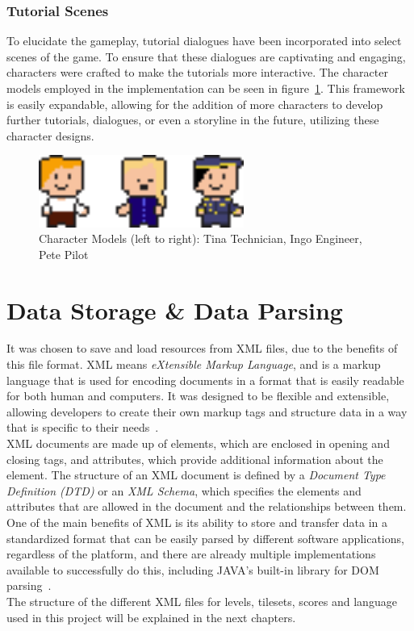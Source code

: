 \subsubsection{Tutorial Scenes}\label{subsubsec:tutorial-scenes}
To elucidate the gameplay, tutorial dialogues have been incorporated into select scenes of the game.
To ensure that these dialogues are captivating and engaging, characters were crafted to make the tutorials more interactive.
The character models employed in the implementation can be seen in figure~\ref{fig:character-models}.
This framework is easily expandable, allowing for the addition of more characters to develop further tutorials,
dialogues, or even a storyline in the future, utilizing these character designs.
\begin{figure}
    \centering
    \includegraphics[width=0.6\textwidth]{Pictures/res/implementation/character-models}
    \caption{Character Models (left to right): Tina Technician, Ingo Engineer, Pete Pilot}
    \label{fig:character-models}
\end{figure}

\section{Data Storage \& Data Parsing}\label{sec:data-storage-&-data-parsing}
It was chosen to save and load resources from XML files, due to the benefits of this file format.
XML means \textit{eXtensible Markup Language}, and is a markup language that is used for encoding documents in a format that is easily readable for both human and computers.
It was designed to be flexible and extensible, allowing developers to create their own markup tags and structure data in a way that is specific to their needs~\cite{xml}.
\\
XML documents are made up of elements, which are enclosed in opening and closing tags, and attributes, which provide additional information about the element.
The structure of an XML document is defined by a \textit{Document Type Definition (DTD)} or an \textit{XML Schema}, which specifies the elements and attributes that are allowed in the document and the relationships between them.
\\
One of the main benefits of XML is its ability to store and transfer data in a standardized format that can be easily parsed by different software applications, regardless of the platform, and there are
already multiple implementations available to successfully do this, including JAVA's built-in library for DOM parsing~\cite{dom-parser}.
\\
The structure of the different XML files for levels, tilesets, scores and language used in this project will be explained in the next chapters.

